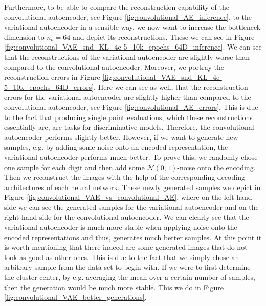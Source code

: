 Furthermore, to be able to compare the reconstruction capability of the convolutional autoencoder, see Figure \ref{fig:convolutional_AE_inference}, to the variational autoencoder in a sensible way, we now want to increase the bottleneck dimension to $n_b=64$ and depict its reconstructions. These we can see in Figure \ref{fig:convolutional_VAE_snd_KL_4e-5_10k_epochs_64D_inference}. We can see that the reconstructions of the variational autoencoder are slightly worse than compared to the convolutional autoencoder. Moreover, we portray the reconstruction errors in Figure \ref{fig:convolutional_VAE_snd_KL_4e-5_10k_epochs_64D_errors}. Here we can see as well, that the reconstruction errors for the variational autoencoder are slightly higher than compared to the convolutional autoencoder, see Figure \ref{fig:convolutional_AE_errors}. This is due to the fact that producing single point evaluations, which these reconstructions essentially are, are tasks for discriminative models. Therefore, the convolutional autoencoder performs slightly better. However, if we want to generate new samples, e.g. by adding some noise onto an encoded representation, the variational autoencoder performs much better. To prove this, we randomly chose one sample for each digit and then add some $\mathcal{N}(0, 1)$-noise onto the encoding. Then we reconstruct the images with the help of the corresponding decoding architectures of each neural network. These newly generated samples we depict in Figure \ref{fig:convolutional_VAE_vs_convolutional_AE}, where on the left-hand side we can see the generated samples for the variational autoencoder and on the right-hand side for the convolutional autoencoder. We can clearly see that the variational autoencoder is much more stable when applying noise onto the encoded representations and thus, generates much better samples. At this point it is worth mentioning that there indeed are some generated images that do not look as good as other ones. This is due to the fact that we simply chose an arbitrary sample from the data set to begin with. If we were to first determine the cluster center, by e.g. averaging the mean over a certain number of samples, then the generation would be much more stable. This we do in Figure \ref{fig:convolutional_VAE_better_generations}.

